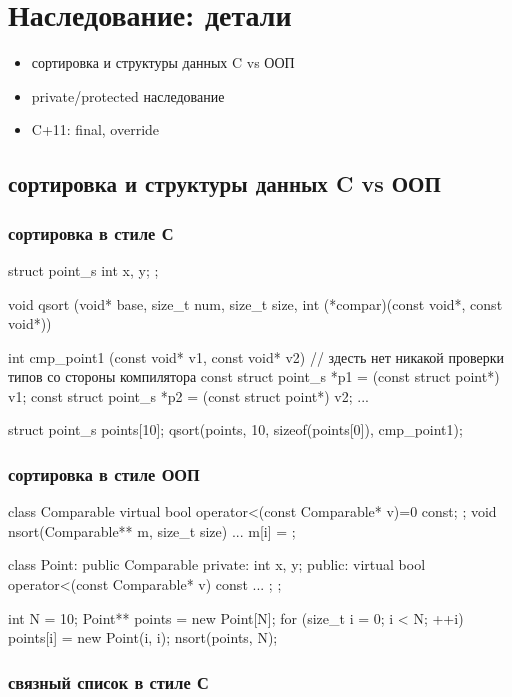 \section{Наследование: детали}
\begin{itemize}[noitemsep]
    \item сортировка и структуры данных C vs ООП
    \item private/protected наследование
    \item C+11: final, override
\end{itemize}
\subsection{сортировка и структуры данных C vs ООП}
\subsubsection{сортировка в стиле С}
\begin{ccode}
struct point_s {
    int x, y;
};

void qsort (void* base, size_t num, size_t size,
	    int (*compar)(const void*, const void*)) {}

int cmp_point1 (const void* v1, const void* v2) { 
    // здесть нет никакой проверки типов со стороны компилятора
    const struct point_s *p1 = (const struct point*) v1;
    const struct point_s *p2 = (const struct point*) v2;
    ...
}

struct point_s points[10];
qsort(points, 10, sizeof(points[0]), cmp_point1);
\end{ccode}
\subsubsection{сортировка в стиле ООП}
\begin{cppcode}
class Comparable {
    virtual bool operator<(const Comparable* v)=0 const;
};
void nsort(Comparable** m, size_t size) {
    ...
    m[i] = ;
}

class Point: public Comparable {
private:
    int x, y;
public:
    virtual bool operator<(const Comparable* v) const { ... };
};

int N = 10;
Point** points = new Point[N];
for (size_t i = 0; i < N; ++i) 
    points[i] = new Point(i, i);
nsort(points, N);
\end{cppcode}
\subsubsection{связный список в стиле С}
